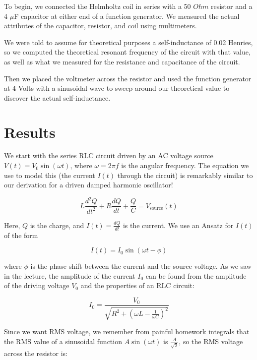 \documentclass[12pt,letterpaper]{article}
\begin{document}
To begin, we connected the Helmholtz coil in series with a 50 $Ohm$ resistor and a 4 $\mu $F capacitor at either end of a function generator. We measured the actual attributes of the capacitor, resistor, and coil using multimeters.

We were told to assume for theoretical purposes a self-inductance of 0.02 Henries, so we computed the theoretical resonant frequency of the circuit with that value, as well as what we measured for the resistance and capacitance of the circuit.

Then we placed the voltmeter across the resistor and used the function generator at 4 Volts with a sinusoidal wave to sweep around our theoretical value to discover the actual self-inductance.

\section{Results}

We start with the series RLC circuit driven by an AC voltage source $V(t) = V_{0} \sin(\omega t)$, where $\omega = 2 \pi f$ is the angular frequency. The equation we use to model this (the current $I(t)$ through the circuit) is remarkably similar to our derivation for a driven damped harmonic oscillator!

\begin{equation}
L \frac{d^2 Q}{dt^2} + R \frac{dQ}{dt} + \frac{Q}{C} = V_{\text{source}}(t)
\end{equation}

Here, $Q$ is the charge, and $I(t) = \frac{dQ}{dt}$ is the current. We use an Ansatz for $I(t)$ of the form

\begin{equation}
I(t) = I_{0}\sin(\omega t - \phi)
\end{equation}

where $\phi$ is the phase shift between the current and the source voltage. As we saw in the lecture, the amplitude of the current $I_{0}$ can be found from the amplitude of the driving voltage $V_{0}$ and the properties of an RLC circuit:

\begin{equation}
I_{0} = \frac{V_{0}}{\sqrt{R^2 + \left( \omega L - \frac{1}{\omega C} \right)^2}}
\end{equation}

Since we want RMS voltage, we remember from painful homework integrals that the RMS value of a sinusoidal function $A \sin(\omega t)$ is $\frac{A}{\sqrt{2}}$, so the RMS voltage across the resistor is:
\end{document}
